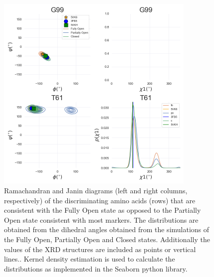 \documentclass[%
 aip,
 amsmath,amssymb,
 preprint,%
]{revtex4-1}
\begin{document}
\begin{figure}[tbp]
	\includegraphics[width=0.85\textwidth]{figures_SI/dihedral_analysis_SI.png}
	 \caption{\scriptsize
Ramachandran and Janin diagrams (left and right columns, respectively) of the discriminating amino acids (rows) that are consistent with the Fully Open state as opposed to the Partially Open state consistent with most markers. The distributions are obtained from the dihedral angles obtained from the simulations of the Fully Open, Partially Open and Closed states. Additionally the values of the XRD structures are included as points or vertical lines.. Kernel density estimation is used to calculate the distributions as implemented in the Seaborn python library. 
}
\label{SI_dihedral}
\end{figure}
\end{document}
